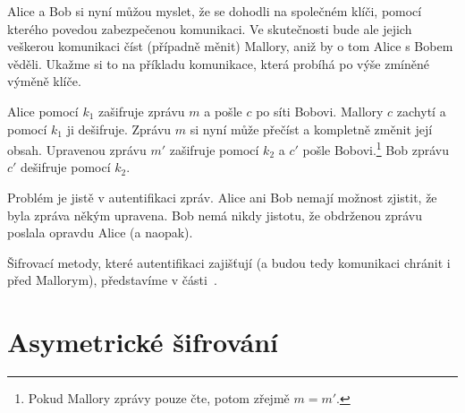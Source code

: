 \documentclass[
  program=infoi,
  biblatex,
  figures=false,
  glossaries,
  index
]{kidiplom}
\begin{document}

        Alice a Bob si nyní můžou myslet, že se dohodli na společném klíči, pomocí kterého povedou zabezpečenou komunikaci.
        Ve skutečnosti bude ale jejich veškerou komunikaci číst (případně měnit) Mallory, aniž by o tom Alice s Bobem věděli.
        Ukažme si to na příkladu komunikace, která probíhá po výše zmíněné výměně klíče.

        Alice pomocí $k_1$ zašifruje zprávu $m$ a pošle $c$ po síti Bobovi. Mallory $c$ zachytí a pomocí $k_1$ ji dešifruje.
        Zprávu $m$ si nyní může přečíst a kompletně změnit její obsah.
        Upravenou zprávu $m'$ zašifruje pomocí $k_2$ a $c'$ pošle Bobovi.\footnote{Pokud Mallory zprávy pouze čte, potom zřejmě $m = m'$.}
        Bob zprávu $c'$ dešifruje pomocí $k_2$.

        Problém je jistě v autentifikaci zpráv. Alice ani Bob nemají možnost zjistit, že byla zpráva někým upravena.
        Bob nemá nikdy jistotu, že obdrženou zprávu poslala opravdu Alice (a naopak).

        \medskip

        Šifrovací metody, které autentifikaci zajišťují (a budou tedy komunikaci chránit i před Mallorym), představíme v části~\ref{public-key}.

    
\part{Asymetrické šifrování}\label{public-key}
\end{document}
